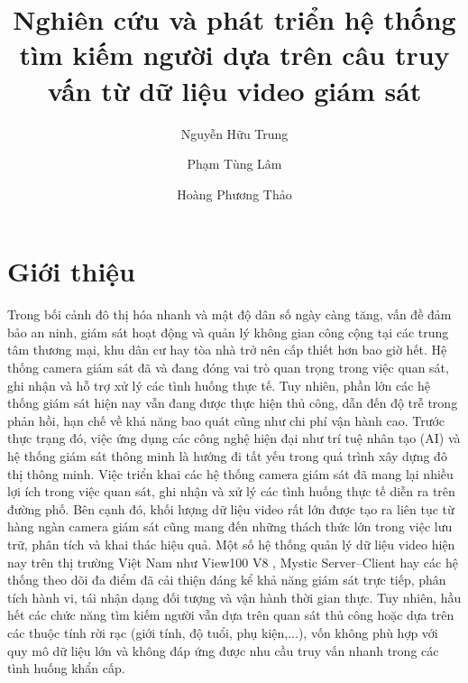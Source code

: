 \documentclass{jstarticle}
\title{Nghiên cứu và phát triển hệ thống tìm kiếm người dựa trên câu truy vấn từ dữ liệu video giám sát}
\author[1,*]{Nguyễn Hữu Trung}
\author[1]{Phạm Tùng Lâm}
\author[1]{Hoàng Phương Thảo}
\begin{document}
\maketitle

\section{Giới thiệu}
Trong bối cảnh đô thị hóa nhanh và mật độ dân số ngày càng tăng, vấn đề đảm bảo an ninh, giám sát hoạt động và quản lý không gian công cộng tại các trung tâm thương mại, khu dân cư hay tòa nhà  trở nên cấp thiết hơn bao giờ hết. Hệ thống camera giám sát đã và đang đóng vai trò quan trọng trong việc quan sát, ghi nhận và hỗ trợ xử lý các tình huống thực tế. Tuy nhiên, phần lớn các hệ thống giám sát hiện nay vẫn đang được thực hiện thủ công, dẫn đến độ trễ trong phản hồi, hạn chế về khả năng bao quát cũng như chi phí vận hành cao. Trước thực trạng đó, việc ứng dụng các công nghệ hiện đại như trí tuệ nhân tạo (AI) và hệ thống giám sát thông minh là hướng đi tất yếu trong quá trình xây dựng đô thị thông minh. Việc triển khai các hệ thống camera giám sát đã mang lại nhiều lợi ích trong việc quan sát, ghi nhận và xử lý các tình huống thực tế diễn ra trên đường phố. Bên cạnh đó, khối lượng dữ liệu video rất lớn được tạo ra liên tục từ hàng ngàn camera giám sát cũng mang đến những thách thức lớn trong việc lưu trữ, phân tích và khai thác hiệu quả.  Một số hệ thống quản lý dữ liệu video hiện nay trên thị trường Việt Nam như View100 V8 \cite{bienbac2022}, Mystic Server–Client \cite{lovad2025mystic} hay các hệ thống theo dõi đa điểm đã cải thiện đáng kể khả năng giám sát trực tiếp, phân tích hành vi, tái nhận dạng đối tượng và vận hành thời gian thực. Tuy nhiên, hầu hết các chức năng tìm kiếm người vẫn dựa trên quan sát thủ công hoặc dựa trên các thuộc tính rời rạc (giới tính, độ tuổi, phụ kiện,...), vốn không phù hợp với quy mô dữ liệu lớn và không đáp ứng được nhu cầu truy vấn nhanh trong các tình huống khẩn cấp. 
\end{document}
